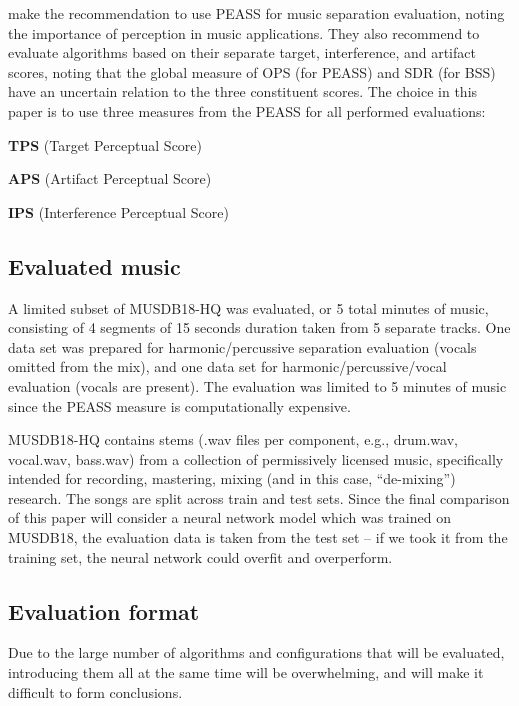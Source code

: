\documentclass[10pt,letter]{article}
\newenvironment{tight_enumerate}{
\begin{enumerate}
\setlength{\itemsep}{0pt}
\setlength{\parskip}{0pt}
}{\end{enumerate}}
\begin{document}
\citet{beassvpeass} make the recommendation to use PEASS for music separation evaluation, noting the importance of perception in music applications. They also recommend to evaluate algorithms based on their separate target, interference, and artifact scores, noting that the global measure of OPS (for PEASS) and SDR (for BSS) have an uncertain relation to the three constituent scores. The choice in this paper is to use three measures from the PEASS for all performed evaluations:
\begin{tight_enumerate}
	\vspace{-0.5em}
	\item
		\textbf{TPS} (Target Perceptual Score)
	\item
		\textbf{APS} (Artifact Perceptual Score)
	\item
		\textbf{IPS} (Interference Perceptual Score)
\end{tight_enumerate}

\subsection{Evaluated music}

A limited subset of MUSDB18-HQ was evaluated, or 5 total minutes of music, consisting of 4 segments of 15 seconds duration taken from 5 separate tracks. One data set was prepared for harmonic/percussive separation evaluation (vocals omitted from the mix), and one data set for harmonic/percussive/vocal evaluation (vocals are present). The evaluation was limited to 5 minutes of music since the PEASS measure is computationally expensive.

MUSDB18-HQ contains stems (.wav files per component, e.g., drum.wav, vocal.wav, bass.wav) from a collection of permissively licensed music, specifically intended for recording, mastering, mixing (and in this case, ``de-mixing'') research. The songs are split across train and test sets. Since the final comparison of this paper will consider a neural network model which was trained on MUSDB18, the evaluation data is taken from the test set -- if we took it from the training set, the neural network could overfit and overperform.

\subsection{Evaluation format}

Due to the large number of algorithms and configurations that will be evaluated, introducing them all at the same time will be overwhelming, and will make it difficult to form conclusions.
\end{document}
